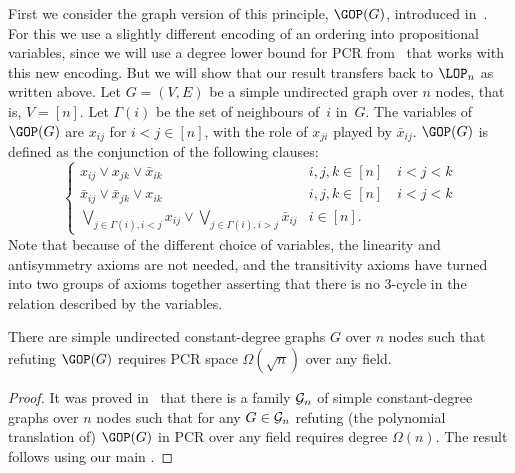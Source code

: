 \documentclass{toc}
\begin{document}
First we consider the graph version of this principle, $\GOP(G)$, introduced
in~\cite{DBLP:journals/siamcomp/SegerlindBI04}.
For this we use a slightly different encoding of an ordering into propositional variables,
since we will use a degree lower bound for PCR from~\cite{DBLP:journals/tocl/GalesiL10}
that works with this new encoding. But we will show that our result transfers back
to $\LOP_n$ as written above.
Let $G=(V,E)$ be a simple undirected graph over $n$ nodes, that is, $V=[n]$.
Let $\Gamma(i)$ be the set of neighbours of~$i$ in~$G$.
The variables of $\GOP(G)$ are $x_{ij}$ for $i<j \in [n]$, with the role of $x_{ji}$ played
by $\bar x_{ij}$. $\GOP(G)$ is defined as the conjunction of the following clauses:
$$
\left \{
\begin{array}{ll}
x_{ij} \vee x_{jk} \vee \bar x_{ik} &  i,j,k \in [n] \quad i<j<k  \\
\bar x_{ij} \vee \bar x_{jk} \vee x_{ik} &  i,j,k \in [n] \quad i<j<k \\
\bigvee_{j\in \Gamma(i), i<j} x_{ij} \vee \bigvee_{j\in \Gamma(i), i>j} \bar x_{ij} & i \in[n].
\end{array}
\right.
$$
Note that because of the different choice of variables, the linearity and antisymmetry axioms are not needed,
and the transitivity axioms have turned into
two groups of axioms together asserting
that there is no 3-cycle in the relation described by the variables. 


\begin{theorem}
\label{cor:GOP}
There are simple undirected constant-degree graphs $G$ over $n$ nodes such that refuting
$\GOP(G)$ requires PCR space $\Omega(\sqrt{n})$ over any field. 
\end{theorem}

\begin{proof}
It was proved in~\cite{DBLP:journals/tocl/GalesiL10} that there is a family ${\cal G}_n$ of simple constant-degree graphs over $n$ nodes such that  for any $G \in  {\cal G}_n$ 
refuting (the polynomial translation of) $\GOP(G)$ in PCR over any field  requires degree $\Omega(n)$.
The result follows using our main .
\end{proof}
\end{document}

